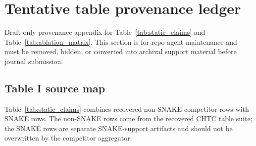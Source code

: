 \documentclass[
  reprint,
  amsmath,
  amssymb,
  aps,
  pra,
  nofootinbib,
  superscriptaddress,
  floatfix
]{revtex4-2}
\newcommand{\tentative}[1]{\textcolor{red!70!black}{#1}}
\begin{document}
\clearpage
\appendix


\section{Tentative table provenance ledger}
\label{app:data_ledger}

\tentative{Draft-only provenance appendix for Table~\ref{tab:static_claims} and Table~\ref{tab:ablation_matrix}. This section is for repo-agent maintenance and must be removed, hidden, or converted into archival support material before journal submission.}

\subsection{Table I source map}
\label{app:table_i_source_map}

Table~\ref{tab:static_claims} combines recovered non-SNAKE competitor rows with SNAKE rows. The non-SNAKE rows come from the recovered CHTC table suite; the SNAKE rows are separate SNAKE-support artifacts and should not be overwritten by the competitor aggregator.
\end{document}
